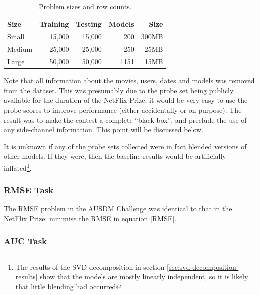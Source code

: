 \documentclass{article}
\begin{document}
\begin{table}[t]
\caption{Problem sizes and row counts.}
\label{problems}
\vskip 0.15in
\begin{center}
\begin{small}
\begin{sc}
\begin{tabular}{lrrrr}
\hline
\abovespace\belowspace
Size & Training & Testing & Models & Size \\
\hline
\abovespace
Small    & 15,000 & 15,000 & 200 & 300MB \\
Medium   & 25,000 & 25,000 & 250 &  25MB \\
\belowspace
Large    & 50,000 & 50,000 & 1151 & 15MB \\
\hline
\end{tabular}
\end{sc}
\end{small}
\end{center}
\vskip -0.1in
\end{table}

Note that all information about the movies, users, dates and models was removed from the dataset.  This was presumably due to the probe set being publicly available for the duration of the NetFlix Prize; it would be very easy to use the probe scores to improve performance (either accidentally or on purpose).  The result was to make the contest a complete ``black box'', and preclude the use of any side-channel information.  This point will be discussed below.

It is unknown if any of the probe sets collected were in fact blended versions of other models.  If they were, then the baseline results would be artificially inflated\footnote{The results of the SVD decomposition in section \ref{sec:svd-decomposition-results} show that the models are mostly linearly independent, so it is likely that little blending had occurred}.

\subsubsection{RMSE Task}

The RMSE problem in the AUSDM Challenge was identical to that in the NetFlix Prize: minimise the RMSE in equation \ref{RMSE}.

\subsubsection{AUC Task}
\end{document}
